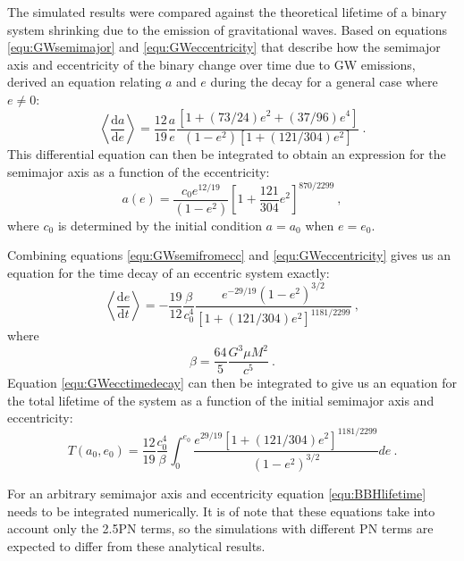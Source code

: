 \documentclass[english, oneside]{HYgradu}
\begin{document}
The simulated results were compared against the theoretical lifetime of a binary system shrinking due to the emission of gravitational waves. Based on equations \eqref{equ:GWsemimajor} and \eqref{equ:GWeccentricity} that describe how the semimajor axis and eccentricity of the binary change over time due to GW emissions, \cite{peters:1964} derived an equation relating $a$ and $e$ during the decay for a general case where $e \neq 0$:
\begin{equation}
\left< \frac{\mathrm{d} a}{\mathrm{d} e} \right> = \frac{12}{19} \frac{a}{e} \frac{\left[ 1 + (73/24)e^2 + (37/96)e^4 \right] }{(1-e^2) \left[ 1 + (121/304)e^2 \right]} \ . \label{equ:GWsemiecc}
\end{equation}
This differential equation can then be integrated to obtain an expression for the semimajor axis as a function of the eccentricity:
\begin{equation}
a(e) = \frac{c_0 e^{12/19}}{(1-e^2)} \left[ 1 + \frac{121}{304} e^2 \right]^{870/2299} \ , \label{equ:GWsemifromecc}
\end{equation}
where $c_0$ is determined by the initial condition $a=a_0$ when $e=e_0$.

Combining equations \eqref{equ:GWsemifromecc} and \eqref{equ:GWeccentricity} gives us an equation for the time decay of an eccentric system exactly:
\begin{equation}
\left< \frac{\mathrm{d} e}{\mathrm{d} t} \right> = - \frac{19}{12} \frac{\beta}{c_0^4} \frac{e^{-29/19} (1-e^2)^{3/2}}{\left[ 1 + (121/304)e^2 \right]^{1181/2299}} \ , \label{equ:GWecctimedecay}
\end{equation}
where 
\begin{equation}
\beta = \frac{64}{5} \frac{G^3 \mu M^2}{c^5} \ .
\end{equation}
Equation \eqref{equ:GWecctimedecay} can then be integrated to give us an equation for the total lifetime of the system as a function of the initial semimajor axis and eccentricity:
\begin{equation}
T(a_0, e_0) = \frac{12}{19} \frac{c_0^4}{\beta} \int_0^{e_0} \frac{e^{29/19} [1 + (121/304)e^2]^{1181/2299}}{(1-e^2)^{3/2}} de \ . \label{equ:BBHlifetime}
\end{equation}

For an arbitrary semimajor axis and eccentricity equation \eqref{equ:BBHlifetime} needs to be integrated numerically.
It is of note that these equations take into account only the 2.5PN terms, so the simulations with different PN terms are expected to differ from these analytical results.
\end{document}
